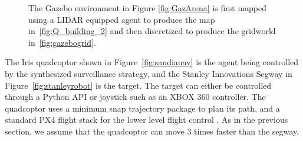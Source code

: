 \begin{figure}
\hspace{0.5cm}

\caption{The Gazebo environment in Figure \ref{fig:GazArena} is first mapped using a LIDAR equipped agent to produce the map in~\ref{fig:Q_building_2} and then discretized to produce the gridworld in~\ref{fig:gazebogrid}.}
\label{fig:casestudiesros}

\end{figure}


The Iris quadcoptor shown in Figure~\ref{fig:sandiauav} is the agent being controlled by the synthesized surveillance strategy, and the Stanley Innovations Segway in Figure~\ref{fig:stanleyrobot} is the target. The target can either be controlled through a Python API or joystick such as an XBOX 360 controller. The quadcoptor uses a minimum snap trajectory package to plan its path, and a standard PX4 flight stack for the lower level flight control \cite{px4}. As in the previous section, we assume that the quadcoptor can move 3 times faster than the segway.


